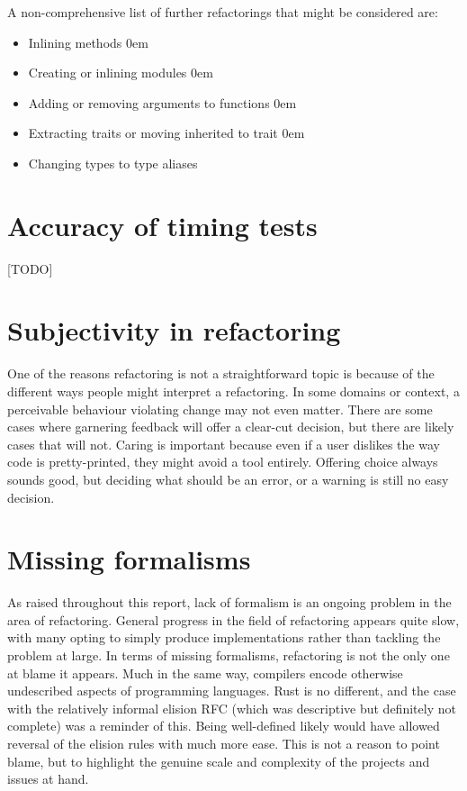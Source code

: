 \noindent
A non-comprehensive list of further refactorings that might be considered are:
\begin{itemize}
\item Inlining methods
\itemsep0em 
\item Creating or inlining modules
\itemsep0em 
\item Adding or removing arguments to functions
\itemsep0em 
\item Extracting traits or moving inherited to trait
\itemsep0em 
\item Changing types to type aliases
\end{itemize}


\section{Accuracy of timing tests}
[TODO]

\section{Subjectivity in refactoring}
One of the reasons refactoring is not a straightforward topic is because of the different ways people might interpret a refactoring. In some domains or context, a perceivable behaviour violating change may not even matter. There are some cases where garnering feedback will offer a clear-cut decision, but there are likely cases that will not. Caring is important because even if a user dislikes the way code is pretty-printed, they might avoid a tool entirely. Offering choice always sounds good, but deciding what should be an error, or a warning is still no easy decision.

\section{Missing formalisms}
As raised throughout this report, lack of formalism is an ongoing problem in the area of refactoring. General progress in the field of refactoring appears quite slow, with many opting to simply produce implementations rather than tackling the problem at large. In terms of missing formalisms, refactoring is not the only one at blame it appears. Much in the same way, compilers encode otherwise undescribed aspects of programming languages. Rust is no different, and the case with the relatively informal elision RFC (which was descriptive but definitely not complete) was a reminder of this. Being well-defined likely would have allowed reversal of the elision rules with much more ease. This is not a reason to point blame, but to highlight the genuine scale and complexity of the projects and issues at hand. 

